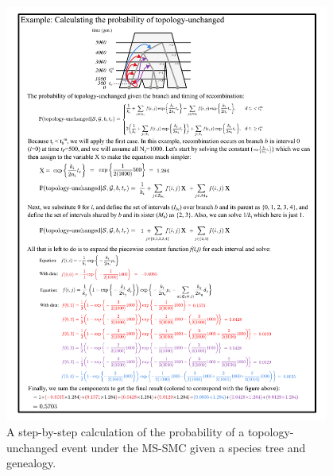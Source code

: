 \documentclass[11pt]{article}
\begin{document}
\begin{figure}[p]
	\centering
	\includegraphics[width=0.95\textwidth]{figures/current/FigS7-equations-topo}
	\caption{A step-by-step calculation of the probability of a topology-unchanged 
	event under the MS-SMC given a species tree and genealogy.
	}
	\label{fig:figS-topo-equations}
\end{figure}
\end{document}
